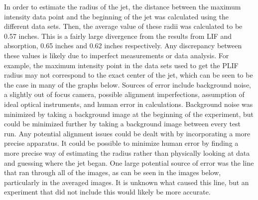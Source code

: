 \documentclass[preview,12pt]{article}
\begin{document}
\indent In order to estimate the radius of the jet, the distance between the maximum intensity data point and the beginning of the jet was calculated using the different data sets.  Then, the average value of these radii was calculated to be 0.57 inches.  This is a fairly large divergence from the results from LIF and absorption, 0.65 inches and 0.62 inches respectively.  Any discrepancy between these values is likely due to imperfect measurements or data analysis.  For example, the maximum intensity point in the data sets used to get the PLIF radius may not correspond to the exact center of the jet, which can be seen to be the case in many of the graphs below. \newline
\indent Sources of error include background noise, a slightly out of focus camera, possible alignment imperfections, assumption of ideal optical instruments, and human error in calculations.  Background noise was minimized by taking a background image at the beginning of the experiment, but could be minimized further by taking a background image between every test run.  Any potential alignment issues could be dealt with by incorporating a more precise apparatus.  It could be possible to minimize human error by finding a more precise way of estimating the radius rather than physically looking at data and guessing where the jet began.  One large potential source of error was the line that ran through all of the images, as can be seen in the images below, particularly in the averaged images.  It is unknown what caused this line, but an experiment that did not include this would likely be more accurate. 
\end{document}
